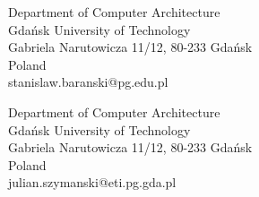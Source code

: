 \documentclass[preprint,3p]{elsarticle}
\begin{document}
\begin{titlepage}
   \begin{center}
       \vspace*{1cm}

       {\Large \TITLE \par}

       \vspace{2cm}

       \textbf{\STANLONG}
            
       Department of Computer Architecture\\
       Gdańsk University of Technology\\
       Gabriela Narutowicza 11/12, 80-233 Gdańsk \\
       Poland\\
       stanislaw.baranski@pg.edu.pl
       
       \vspace{1cm}
       
       \textbf{\JULLONG}
            
       Department of Computer Architecture\\
       Gdańsk University of Technology\\
       Gabriela Narutowicza 11/12, 80-233 Gdańsk \\
       Poland\\
       julian.szymanski@eti.pg.gda.pl
       
            
   \end{center}
\end{titlepage}
\end{document}

